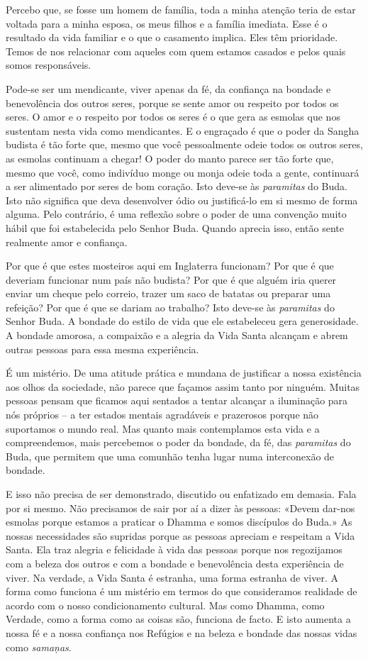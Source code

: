 Percebo que, se fosse um homem de família, toda a minha atenção teria de estar
voltada para a minha esposa, os meus filhos e a família imediata. Esse é o
resultado da vida familiar e o que o casamento implica. Eles têm prioridade.
Temos de nos relacionar com aqueles com quem estamos casados e pelos quais somos
responsáveis.

Pode-se ser um mendicante, viver apenas da fé, da confiança na bondade e
benevolência dos outros seres, porque se sente amor ou respeito por todos os
seres. O amor e o respeito por todos os seres é o que gera as esmolas que nos
sustentam nesta vida como mendicantes. E o engraçado é que o poder da Sangha
budista é tão forte que, mesmo que você pessoalmente odeie todos os outros
seres, as esmolas continuam a chegar! O poder do manto parece ser tão forte que,
mesmo que você, como indivíduo monge ou monja odeie toda a gente, continuará a
ser alimentado por seres de bom coração. Isto deve-se às \emph{paramitas} do
Buda. Isto não significa que deva desenvolver ódio ou justificá-lo em si mesmo
de forma alguma. Pelo contrário, é uma reflexão sobre o poder de uma convenção
muito hábil que foi estabelecida pelo Senhor Buda. Quando aprecia isso, então
sente realmente amor e confiança.

Por que é que estes mosteiros aqui em Inglaterra funcionam? Por que é que
deveriam funcionar num país não budista? Por que é que alguém iria querer enviar
um cheque pelo correio, trazer um saco de batatas ou preparar uma refeição? Por
que é que se dariam ao trabalho? Isto deve-se às \emph{paramitas} do Senhor
Buda. A bondade do estilo de vida que ele estabeleceu gera generosidade. A
bondade amorosa, a compaixão e a alegria da Vida Santa alcançam e abrem outras
pessoas para essa mesma experiência.

É um mistério. De uma atitude prática e mundana de justificar a nossa existência
aos olhos da sociedade, não parece que façamos assim tanto por ninguém. Muitas
pessoas pensam que ficamos aqui sentados a tentar alcançar a iluminação para nós
próprios -- a ter estados mentais agradáveis e prazerosos porque não suportamos
o mundo real. Mas quanto mais contemplamos esta vida e a compreendemos, mais
percebemos o poder da bondade, da fé, das \emph{paramitas} do Buda, que permitem
que uma comunhão tenha lugar numa interconexão de bondade.

E isso não precisa de ser demonstrado, discutido ou enfatizado em demasia. Fala
por si mesmo. Não precisamos de sair por aí a dizer às pessoas: «Devem dar-nos
esmolas porque estamos a praticar o Dhamma e somos discípulos do Buda.» As
nossas necessidades são supridas porque as pessoas apreciam e respeitam a Vida
Santa. Ela traz alegria e felicidade à vida das pessoas porque nos regozijamos
com a beleza dos outros e com a bondade e benevolência desta experiência de
viver. Na verdade, a Vida Santa é estranha, uma forma estranha de viver. A forma
como funciona é um mistério em termos do que consideramos realidade de acordo
com o nosso condicionamento cultural. Mas como Dhamma, como Verdade, como a
forma como as coisas são, funciona de facto. E isto aumenta a nossa fé e a nossa
confiança nos Refúgios e na beleza e bondade das nossas vidas como
\emph{samaṇas}.

